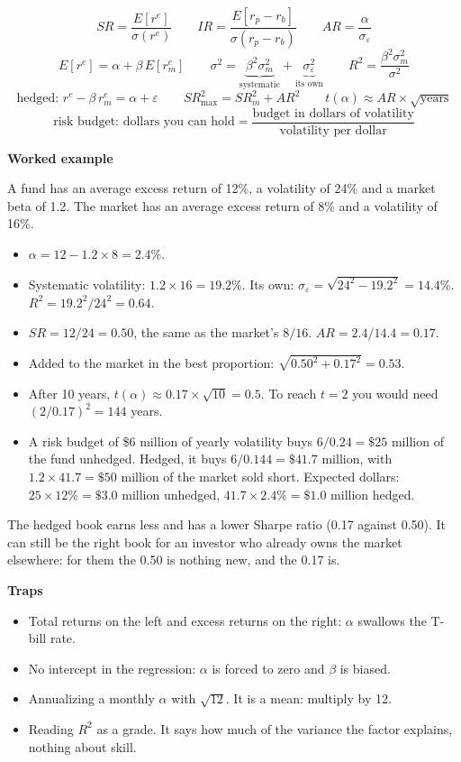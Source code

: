 \documentclass[11pt]{article}
\newcounter{ex}[section]
\newcommand{\head}[1]{\par\medskip\textbf{#1}\par}
\newcommand{\re}{r^{e}}
\newcommand{\SR}{\mathit{SR}}
\newcommand{\AR}{\mathit{AR}}
\newcommand{\IR}{\mathit{IR}}
\begin{document}
\begin{keybox}
\[ \SR = \frac{E[\re]}{\sigma(\re)} \qquad \IR = \frac{E[r_{p} - r_{b}]}{\sigma(r_{p} - r_{b})} \qquad
   \AR = \frac{\alpha}{\sigma_{\varepsilon}} \]
\[ E[\re] = \alpha + \beta\,E[\re_{m}] \qquad
   \sigma^{2} = \underbrace{\beta^{2}\sigma_{m}^{2}}_{\text{systematic}} + \underbrace{\sigma_{\varepsilon}^{2}}_{\text{its own}}
   \qquad R^{2} = \frac{\beta^{2}\sigma_{m}^{2}}{\sigma^{2}} \]
\[ \text{hedged: } \re - \beta\,\re_{m} = \alpha + \varepsilon
   \qquad \SR^{2}_{\max} = \SR_{m}^{2} + \AR^{2}
   \qquad t(\alpha) \approx \AR \times \sqrt{\text{years}} \]
\[ \text{risk budget: dollars you can hold} = \frac{\text{budget in dollars of volatility}}{\text{volatility per dollar}} \]
\end{keybox}

\head{Worked example}
A fund has an average excess return of 12\%, a volatility of 24\% and a market beta of 1.2. The market has an average
excess return of 8\% and a volatility of 16\%.
\begin{itemize}
\item $\alpha = 12 - 1.2 \times 8 = 2.4\%$.
\item Systematic volatility: $1.2 \times 16 = 19.2\%$. Its own: $\sigma_{\varepsilon} = \sqrt{24^{2} - 19.2^{2}} = 14.4\%$.
$R^{2} = 19.2^{2}/24^{2} = 0.64$.
\item $\SR = 12/24 = 0.50$, the same as the market's $8/16$. $\AR = 2.4/14.4 = 0.17$.
\item Added to the market in the best proportion: $\sqrt{0.50^{2} + 0.17^{2}} = 0.53$.
\item After 10 years, $t(\alpha) \approx 0.17\times\sqrt{10} = 0.5$. To reach $t = 2$ you would need $(2/0.17)^{2} = 144$ years.
\item A risk budget of \$6 million of yearly volatility buys $6/0.24 = \$25$ million of the fund unhedged. Hedged, it buys
$6/0.144 = \$41.7$ million, with $1.2\times 41.7 = \$50$ million of the market sold short. Expected dollars: $25\times 12\% =
\$3.0$ million unhedged, $41.7\times 2.4\% = \$1.0$ million hedged.
\end{itemize}
The hedged book earns less and has a lower Sharpe ratio (0.17 against 0.50). It can still be the right book for an
investor who already owns the market elsewhere: for them the 0.50 is nothing new, and the 0.17 is.

\head{Traps}
\begin{itemize}
\item Total returns on the left and excess returns on the right: $\alpha$ swallows the T-bill rate.
\item No intercept in the regression: $\alpha$ is forced to zero and $\beta$ is biased.
\item Annualizing a monthly $\alpha$ with $\sqrt{12}$. It is a mean: multiply by 12.
\item Reading $R^{2}$ as a grade. It says how much of the variance the factor explains, nothing about skill.
\end{itemize}
\end{document}
